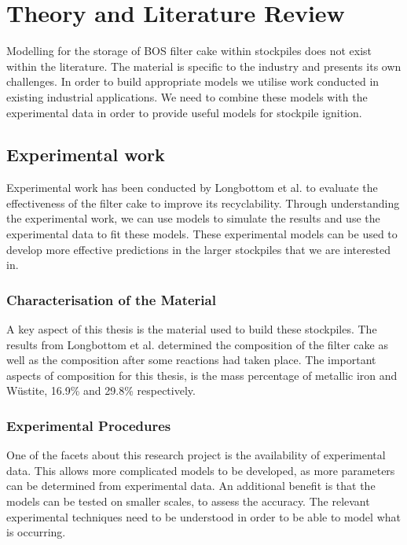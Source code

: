 \chapter{Theory and Literature Review}
Modelling for the storage of BOS filter cake within stockpiles does not exist within the literature. The material is specific to the industry and presents its own challenges. In order to build appropriate models we utilise work conducted in existing industrial applications. We need to combine these models with the experimental data in order to provide useful models for stockpile ignition.

\section{Experimental work}
Experimental work has been conducted by Longbottom et al. \cite{Ray19} to evaluate the effectiveness of the filter cake to improve its recyclability. Through understanding the experimental work, we can use models to simulate the results and use the experimental data to fit these models. These experimental models can be used to develop more effective predictions in the larger stockpiles that we are interested in.

\subsection{Characterisation of the Material}
A key aspect of this thesis is the material used to build these stockpiles. The results from Longbottom et al. \cite{Ray19} determined the composition of the filter cake as well as the composition after some reactions had taken place. The important aspects of composition for this thesis, is the mass percentage of metallic iron and W\"{u}stite, 16.9\% and 29.8\% respectively. 
\subsection{Experimental Procedures}
One of the facets about this research project is the availability of experimental data. This allows more complicated models to be developed, as more parameters can be determined from experimental data. An additional benefit is that the models can be tested on smaller scales, to assess the accuracy. The relevant experimental techniques need to be understood in order to be able to model what is occurring.

